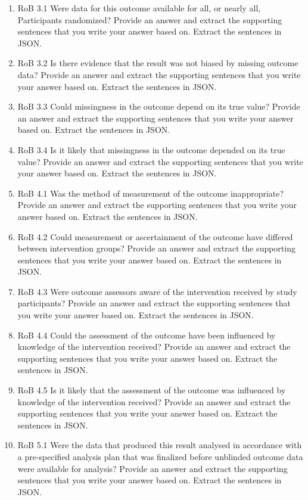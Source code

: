 \documentclass[sn-mathphys,Numbered]{sn-jnl}%
\begin{document}
\begin{enumerate}
    \item RoB 3.1 Were data for this outcome available for all, or nearly all, Participants randomized?  Provide an answer and extract the supporting sentences that you write your answer based on. Extract the sentences in JSON.
    \item RoB 3.2 Is there evidence that the result was not biased by missing outcome data?  Provide an answer and extract the supporting sentences that you write your answer based on. Extract the sentences in JSON.
    \item RoB 3.3 Could missingness in the outcome depend on its true value?  Provide an answer and extract the supporting sentences that you write your answer based on. Extract the sentences in JSON.
    \item RoB 3.4 Is it likely that missingness in the outcome depended on its true value?  Provide an answer and extract the supporting sentences that you write your answer based on. Extract the sentences in JSON.
    \item RoB 4.1 Was the method of measurement of the outcome inappropriate?  Provide an answer and extract the supporting sentences that you write your answer based on. Extract the sentences in JSON.
    \item RoB 4.2 Could measurement or ascertainment of the outcome have differed between intervention groups?  Provide an answer and extract the supporting sentences that you write your answer based on. Extract the sentences in JSON.
    \item RoB 4.3 Were outcome assessors aware of the intervention received by study participants?  Provide an answer and extract the supporting sentences that you write your answer based on. Extract the sentences in JSON.
    \item RoB 4.4 Could the assessment of the outcome have been influenced by knowledge of the intervention received?  Provide an answer and extract the supporting sentences that you write your answer based on. Extract the sentences in JSON.
    \item RoB 4.5 Is it likely that the assessment of the outcome was influenced by knowledge of the intervention received?  Provide an answer and extract the supporting sentences that you write your answer based on. Extract the sentences in JSON.
    \item RoB 5.1 Were the data that produced this result analysed in accordance with a pre-specified analysis plan that was finalized before unblinded outcome data were available for analysis?  Provide an answer and extract the supporting sentences that you write your answer based on. Extract the sentences in JSON.

\end{enumerate}
\end{document}
